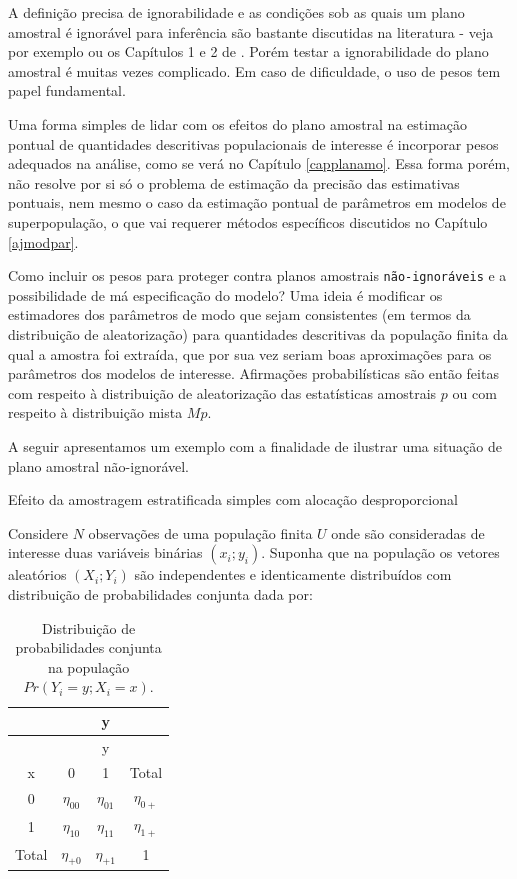 \documentclass[]{book}
\theoremstyle{definition}
\theoremstyle{definition}
\theoremstyle{definition}
\theoremstyle{remark}
\let\BeginKnitrBlock\begin \let\EndKnitrBlock\end
\begin{document}
A definição precisa de ignorabilidade e as condições sob as quais um
plano amostral é ignorável para inferência são bastante discutidas na
literatura - veja por exemplo \citep{Sugden84} ou os Capítulos 1 e 2 de
\citep{CHSK2003}. Porém testar a ignorabilidade do plano amostral é
muitas vezes complicado. Em caso de dificuldade, o uso de pesos tem
papel fundamental.

Uma forma simples de lidar com os efeitos do plano amostral na estimação
pontual de quantidades descritivas populacionais de interesse é
incorporar pesos adequados na análise, como se verá no Capítulo
\ref{capplanamo}. Essa forma porém, não resolve por si só o problema de
estimação da precisão das estimativas pontuais, nem mesmo o caso da
estimação pontual de parâmetros em modelos de superpopulação, o que vai
requerer métodos específicos discutidos no Capítulo \ref{ajmodpar}.

Como incluir os pesos para proteger contra planos amostrais
\texttt{não-ignoráveis} e a possibilidade de má especificação do modelo?
Uma ideia é modificar os estimadores dos parâmetros de modo que sejam
consistentes (em termos da distribuição de aleatorização) para
quantidades descritivas da população finita da qual a amostra foi
extraída, que por sua vez seriam boas aproximações para os parâmetros
dos modelos de interesse. Afirmações probabilísticas são então feitas
com respeito à distribuição de aleatorização das estatísticas amostrais
\(p\) ou com respeito à distribuição mista \(Mp\).

A seguir apresentamos um exemplo com a finalidade de ilustrar uma
situação de plano amostral não-ignorável.

\BeginKnitrBlock{example}
\protect\hypertarget{exm:nonigno}{}{\label{exm:nonigno} }Efeito da
amostragem estratificada simples com alocação desproporcional
\EndKnitrBlock{example}

Considere \(N\) observações de uma população finita \(U\) onde são
consideradas de interesse duas variáveis binárias \((x_i ; y_i )\).
Suponha que na população os vetores aleatórios \((X_i ; Y_i )\) são
independentes e identicamente distribuídos com distribuição de
probabilidades conjunta dada por:

\begin{longtable}[]{@{}cccc@{}}
\caption{\label{tab:Tab24} Distribuição de probabilidades conjunta na
população \(Pr( Y_i = y ; X_i = x )\).}\tabularnewline
\toprule
& & y &\tabularnewline
\midrule
\endfirsthead
\toprule
& & y &\tabularnewline
\midrule
\endhead
x & 0 & 1 & Total\tabularnewline
0 & \(\eta_{00}\) & \(\eta_{01}\) & \(\eta_{0+}\)\tabularnewline
1 & \(\eta_{10}\) & \(\eta_{11}\) & \(\eta_{1+}\)\tabularnewline
Total & \(\eta_{+0}\) & \(\eta_{+1}\) & 1\tabularnewline
\bottomrule
\end{longtable}
\end{document}
